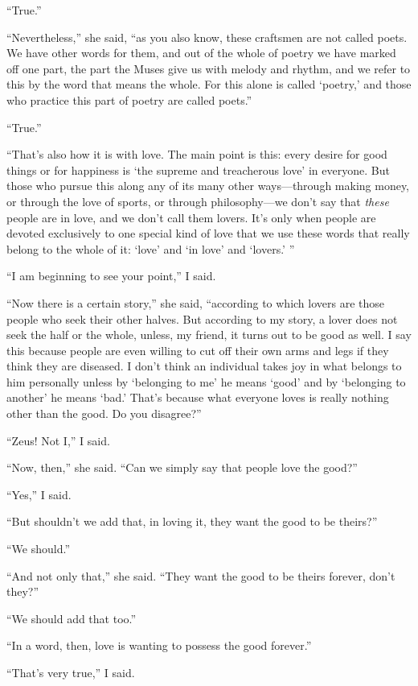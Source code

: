 “True.”

“Nevertheless,” she said, “as you also know, these craftsmen are not
called poets. We have other words for them, and out of the whole of
poetry we have marked off one part, the part the Muses give us with
melody and rhythm, and we refer to this by the word that means the
whole. For this alone is called ‘poetry,' and those who practice this
part of poetry are called poets.”

 “True.”

“That's also how it is with love. The main point is this: every desire
for good things or for happiness is ‘the supreme and treacherous love'
in everyone. But those who pursue this along any of its many other
ways---through making money, or through the love of sports, or through
philosophy---we don't say that {\em these} people are in love, and we
don't call them lovers. It's only when people are devoted exclusively to
one special kind of love that we use these words that really belong to
the whole of it: ‘love' and ‘in love' and ‘lovers.' ”

“I am beginning to see your point,” I said.

 “Now there is a certain story,” she said, “according to which
lovers are those people who seek their other halves. But according to my
story, a lover does not seek the half or the whole, unless, my friend,
it turns out to be good as well. I say this because people are even
willing to cut off their own arms and legs if they think they are
diseased. I don't think an individual takes joy in what belongs to him
personally unless by ‘belonging to me' he means ‘good' and by ‘belonging
to another' he means ‘bad.' That's because what everyone loves is really
nothing other than the good.  Do you disagree?”

“Zeus! Not I,” I said.

“Now, then,” she said. “Can we simply say that people love the good?”

“Yes,” I said.

“But shouldn't we add that, in loving it, they want the good to be
theirs?”

“We should.”

“And not only that,” she said. “They want the good to be theirs forever,
don't they?”

“We should add that too.”

“In a word, then, love is wanting to possess the good forever.”

“That's very true,” I said. 

